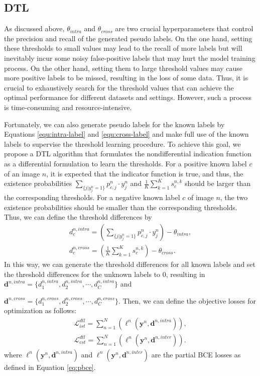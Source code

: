 \subsection{DTL}
\label{sec:dtl}
As discussed above, $\theta_{intra}$ and $\theta_{cross}$ are two crucial hyperparameters that control the precision and recall of the generated pseudo labels. On the one hand, setting these thresholds to small values may lead to the recall of more labels but will inevitably incur some noisy false-positive labels that may hurt the model training process. On the other hand, setting them to large threshold values may cause more positive labels to be missed, resulting in the loss of some data. Thus, it is crucial to exhaustively search for the threshold values that can achieve the optimal performance for different datasets and settings. However, such a process is time-consuming and resource-intensive.

Fortunately, we can also generate pseudo labels for the known labels by Equations \ref{equ:intra-label} and \ref{equ:cross-label} and make full use of the known labels to supervise the threshold learning procedure. To achieve this goal, we propose a DTL algorithm that formulates the nondifferential indication function as a differential formulation to learn the thresholds. For a positive known label $c$ of an image $n$, it is expected that the indicator function is true, and thus, the existence probabilities $\sum_{\{j|y^{n}_{j}=1\}}p_{c,j}^{n} \cdot y^{n}_{j}$ and $\frac{1}{K}\sum_{k=1}^Ks_{c}^{n,k}$ should be larger than the corresponding thresholds. For a negative known label $c$ of image $n$, the two existence probabilities should be smaller than the corresponding thresholds. Thus, we can define the threshold differences by
\begin{gather}
 d^{n, intra}_{c}=(\sum_{\{j|y^{n}_{j}=1\}}p_{c,j}^{n} \cdot y^{n}_{j}) - \theta_{intra}, \\
 d^{n, cross}_{c}=(\frac{1}{K}\sum_{k=1}^Ks_{c}^{n,k}) - \theta_{cross}.
\end{gather}
In this way, we can generate the threshold differences for all known labels and set the threshold differences for the unknown labels to 0, resulting in $\textbf{d}^{n, intra}=\{d^{n, intra}_1, d^{n, intra}_2, \cdots, d^{n, intra}_C\}$ and 

$\textbf{d}^{n, cross}=\{d^{n, cross}_1, d^{n, cross}_2, \cdots, d^{n, cross}_C\}$. Then, we can define the objective losses for optimization as follows:
\begin{gather}
\mathcal{L}_{ist}^{dtl}= \sum_{n=1}^N(\ell^{n}(\textbf{y}^n, \textbf{d}^{n, intra})), \\
\mathcal{L}_{cst}^{dtl}= \sum_{n=1}^N(\ell^{n}(\textbf{y}^n, \textbf{d}^{n, inter})).
\end{gather}
where $\ell^{n}(\textbf{y}^n, \textbf{d}^{n, intra})$ and $\ell^{n}(\textbf{y}^n, \textbf{d}^{n, inter})$ are the partial BCE losses as defined in Equation \ref{eq:pbce}.

